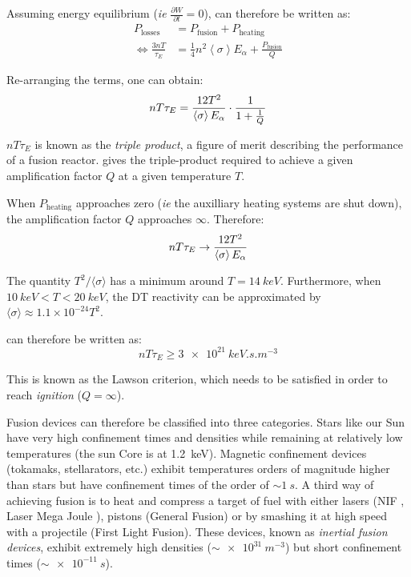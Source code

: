 Assuming energy equilibrium (\textit{ie} $\frac{\partial W}{\partial t} = 0$),  can therefore be written as:
\begin{align}
    P_\mathrm{losses} &= P_\mathrm{fusion} + P_\mathrm{heating} \\
    \Leftrightarrow \frac{3 n T}{\tau_E} &= \frac{1}{4} n^2 \left\langle \sigma \right\rangle E_\alpha + \frac{P_\mathrm{fusion}}{Q}
\end{align}

Re-arranging the terms, one can obtain:
\begin{equation}
    n T \tau_E = \frac{12 T^2}{\left\langle \sigma \right\rangle E_\alpha} \cdot \frac{1}{1 + \frac{1}{Q}}
    \labeq{triple product}
\end{equation}

$n T \tau_E$ is known as the \textit{triple product}, a figure of merit describing the performance of a fusion reactor.
 gives the triple-product required to achieve a given amplification factor $Q$ at a given temperature $T$.

When $P_\mathrm{heating}$ approaches zero (\textit{ie} the auxilliary heating systems are shut down), the amplification factor $Q$ approaches $\infty$.
Therefore:
\begin{equation}
    n T \tau_E \rightarrow \frac{12 T^2}{\left\langle \sigma \right\rangle E_\alpha}
    \labeq{triple product infinity}
\end{equation}

The quantity $T^2/\langle \sigma \rangle$ has a minimum around $T=\SI{14}{keV}$.
Furthermore, when $\SI{10}{keV} < T < \SI{20}{keV}$, the DT reactivity can be approximated by $\langle \sigma \rangle \approx 1.1 \times 10^{-24} T^2$.

 can therefore be written as:
\begin{equation}
    n T \tau_E \geq \SI{3e21}{keV.s.m^{-3}}
\end{equation}

This is known as the Lawson criterion, which needs to be satisfied in order to reach \textit{ignition} ($Q = \infty$).


Fusion devices can therefore be classified into three categories.
Stars like our Sun have very high confinement times and densities while remaining at relatively low temperatures (the sun Core is at \SI{1.2}{keV}).
Magnetic confinement devices (tokamaks, stellarators, etc.) exhibit temperatures orders of magnitude higher than stars but have confinement times of the order of $\sim \SI{1}{s}$.
A third way of achieving fusion is to heat and compress a target of fuel with either lasers (NIF , Laser Mega Joule ), pistons (General Fusion) or by smashing it at high speed with a projectile (First Light Fusion).
These devices, known as \textit{inertial fusion devices}, exhibit extremely high densities ($\sim \SI{e31}{m^{-3}}$) but short confinement times ($\sim \SI{e-11}{s}$).
 
